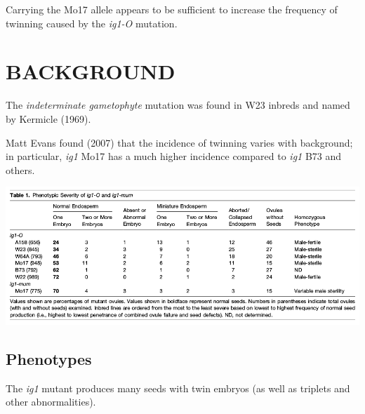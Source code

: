 \documentclass[a0,portrait]{a0poster}
\newlength{\figwidth}
\begin{document}
\begin{multicols}{3}
  Carrying the Mo17 allele appears to be sufficient to increase the frequency of twinning caused by the \textit{ig1-O} mutation.

  \section*{BACKGROUND}

  The \textit{indeterminate gametophyte} mutation was found in W23 inbreds and named by Kermicle (1969).

  Matt Evans found (2007) that the incidence of twinning varies with background; in particular, \textit{ig1} Mo17 has a much higher incidence compared to \textit{ig1} B73 and others.

  \begin{center}
    \includegraphics[width=\figwidth]{Evans-2007-Table-1.png}
  \end{center}

  \subsection*{Phenotypes}

  The \textit{ig1} mutant produces many seeds with twin embryos (as well as triplets and other abnormalities).


\end{multicols}
\end{document}
